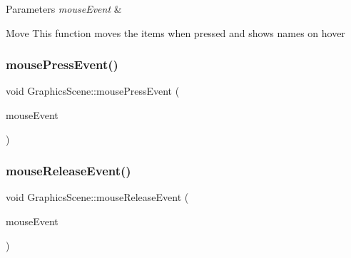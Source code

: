 \begin{DoxyParams}{Parameters}
{\em mouse\+Event} & \\
\hline
\end{DoxyParams}
\begin{DoxyParagraph}{Move}
This function moves the items when pressed and shows names on hover 
\end{DoxyParagraph}
\mbox{\label{class_graphics_scene_ae2cdfb607a8ce680f0ed8c93c519ff01}} 
\subsubsection{\texorpdfstring{mouse\+Press\+Event()}{mousePressEvent()}}
{\footnotesize\ttfamily void Graphics\+Scene\+::mouse\+Press\+Event (\begin{DoxyParamCaption}\item[{Q\+Graphics\+Scene\+Mouse\+Event $\ast$}]{mouse\+Event }\end{DoxyParamCaption})\hspace{0.3cm}{\ttfamily [override]}}

\mbox{\label{class_graphics_scene_a5f83aea5c35bad170a3c766ab41bacf5}} 
\subsubsection{\texorpdfstring{mouse\+Release\+Event()}{mouseReleaseEvent()}}
{\footnotesize\ttfamily void Graphics\+Scene\+::mouse\+Release\+Event (\begin{DoxyParamCaption}\item[{Q\+Graphics\+Scene\+Mouse\+Event $\ast$}]{mouse\+Event }\end{DoxyParamCaption})\hspace{0.3cm}{\ttfamily [override]}}

\mbox{\label{class_graphics_scene_acfc07dfc3d559fc497cde524dc8ffa66}} 
